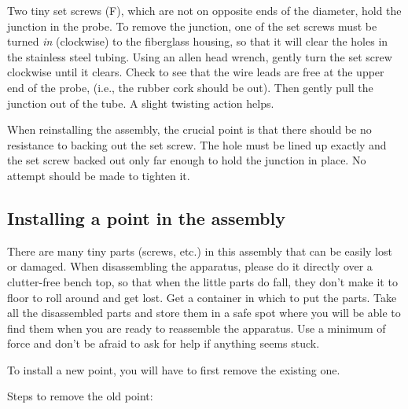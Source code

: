 \documentclass{../lab}
\begin{document}
Two tiny set screws (F), which are not on opposite ends of the diameter, hold the junction in the probe. To remove the junction, one of the set screws must be turned \emph{in} (clockwise) to the fiberglass housing, so that it will clear the holes in the stainless steel tubing. Using an allen head wrench, gently turn the set screw clockwise until it clears. Check to see that the wire leads are free at the upper end of the probe, (i.e., the rubber cork should be out). Then gently pull the junction out of the tube. A slight twisting action helps.

When reinstalling the assembly, the crucial point is that there should be no resistance to backing out the set screw. The hole must be lined up exactly and the set screw backed out only far enough to hold the junction in place. No attempt should be made to tighten it.

\subsection{Installing a point in the assembly}

There are many tiny parts (screws, etc.) in this assembly that can be easily lost or damaged. When disassembling the apparatus, please do it directly over a clutter-free bench top, so that when the little parts do fall, they don't make it to floor to roll around and get lost. Get a container in which to put the parts. Take all the disassembled parts and store them in a safe spot where you will be able to find them when you are ready to reassemble the apparatus. Use a minimum of force and don't be afraid to ask for help if anything seems stuck.

To install a new point, you will have to first remove the existing one.

\noindent Steps to remove the old point:
\end{document}
